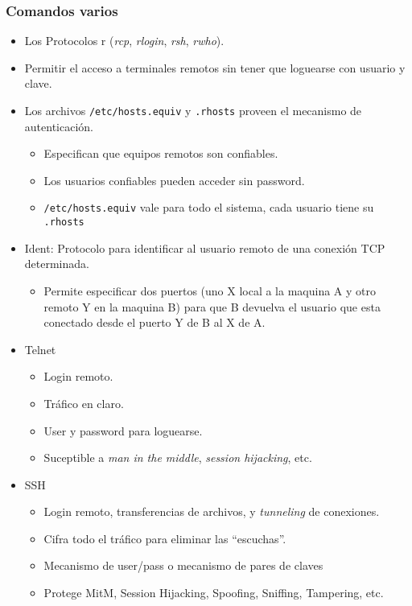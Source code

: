 \subsubsection{Comandos varios}

\begin{itemize}
	\item Los Protocolos r (\textit{rcp}, \textit{rlogin}, \textit{rsh}, \textit{rwho}). 
	\item Permitir el acceso a terminales remotos sin tener que loguearse con usuario y clave.
	\item Los archivos \texttt{/etc/hosts.equiv} y \texttt{.rhosts} proveen el mecanismo de autenticación.
	\begin{itemize}
		\item Especifican que equipos remotos son confiables.
		\item Los usuarios confiables pueden acceder sin password.
		\item \texttt{/etc/hosts.equiv} vale para todo el sistema, cada usuario tiene su \texttt{.rhosts}
	\end{itemize}
	\item Ident: Protocolo para identificar al usuario remoto de una conexión TCP determinada.
	\begin{itemize}
		\item Permite especificar dos puertos (uno X local a la maquina A y otro remoto Y en la maquina B) para que
		B devuelva el usuario que esta conectado desde el puerto Y de B al X de A.
	\end{itemize}
	\item Telnet
	\begin{itemize}
		\item Login remoto.
		\item Tráfico en claro.
		\item User y password para loguearse.
		\item Suceptible a \textit{man in the middle}, \textit{session hijacking}, etc.
	\end{itemize}
	\item SSH
	\begin{itemize}
		\item Login remoto, transferencias de archivos, y \textit{tunneling} de conexiones.
		\item Cifra todo el tráfico para eliminar las ``escuchas''.
		\item Mecanismo de user/pass o mecanismo de pares de claves 
		\item Protege MitM, Session Hijacking, Spoofing, Sniffing, Tampering, etc.

\end{itemize}
\end{itemize}
